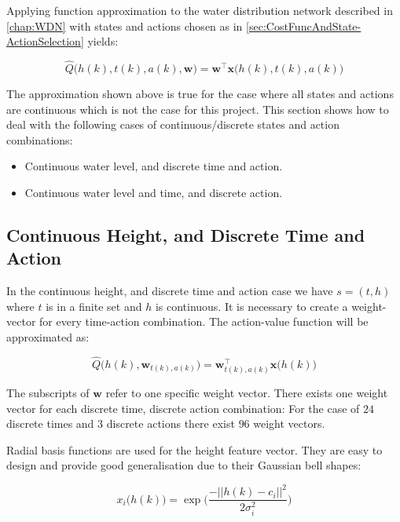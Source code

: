 Applying function approximation to the water distribution network described in \cref{chap:WDN} with states and actions chosen as in \cref{sec:CostFuncAndState-ActionSelection} yields: 

\begin{equation}
	\hat{Q}\bigg(h(k),t(k),a(k),\textbf{w}\bigg)=\textbf{w}^{\intercal}\textbf{x}\bigg(h(k),t(k),a(k)\bigg)
\end{equation}

The approximation shown above is true for the case where all states and actions are continuous which is not the case for this project. This section shows how to deal with the following cases of continuous/discrete states and action combinations:

\begin{itemize}
	\item Continuous water level, and discrete time and action.
	\item Continuous water level and time, and discrete action.
\end{itemize} 

\subsection{Continuous Height, and Discrete Time and Action}\label{sec:WDN1D}

In the continuous height, and discrete time and action case we have $ s = (t,h) $ where $ t $ is in a finite set and $ h $ is continuous. It is necessary to create a weight-vector for every time-action combination. The action-value function will be approximated as:

\begin{equation}\label{eq:Qhat2Discrete}
	\hat{Q}\bigg(h(k),\textbf{w}_{t(k),a(k)}\bigg)=\textbf{w}_{t(k),a(k)}^{\intercal}\textbf{x}\bigg(h(k)\bigg)
\end{equation} 

The subscripts of $ \textbf{w} $ refer to one specific weight vector. There exists one weight vector for each discrete time, discrete action combination: For the case of $ 24 $ discrete times and $ 3 $ discrete actions there exist $ 96 $ weight vectors.

Radial basis functions are used for the height feature vector. They are easy to design and provide good generalisation due to their Gaussian bell shapes:

\begin{equation}\label{eq:RBF}
	x_{i}\bigg(h(k)\bigg) = \exp\bigg(\frac{-||h(k)-c_{i}||^2}{2\sigma_{i}^2}\bigg)
\end{equation}

